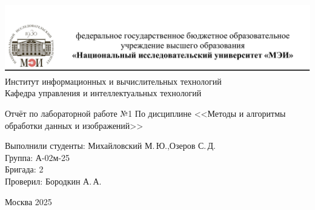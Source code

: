 \begin{titlepage}
	\newpage
	\begin{center}
		\includegraphics[width=\textwidth]{png/tit.png}
		Институт информационных и вычислительных технологий \\
			Кафедра управления и интеллектуальных технологий
		\vspace{1.25cm}
	\end{center}
	
	\vspace{1.2em}
	
	\begin{center}
		\begin{spacing}{1}
			{\large Отчёт по лабораторной работе №1 \linebreak
			По дисциплине <<Методы и алгоритмы обработки данных и изображений>> \\}
		\end{spacing}
	\end{center}
	
	\vspace{5em}
	

	\vspace{6em}
	
		\noindent Выполнили студенты: Михайловский М.\,Ю.,\;Озеров С.\,Д. \\
		Группа: А-02м-25 \\
		Бригада: 2\\
		Проверил: Бородкин А.\,А.
	
	
	\vspace{\fill}
	
	\begin{center}
		Москва 2025
	\end{center}
	
\end{titlepage}